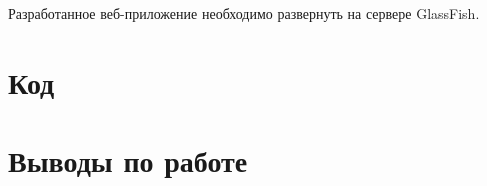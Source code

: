 \documentclass[a4paper, 12pt]{article}
\begin{document}
Разработанное веб-приложение необходимо развернуть на сервере GlassFish.


\section{Код}





\section{Выводы по работе}

\end{document}
